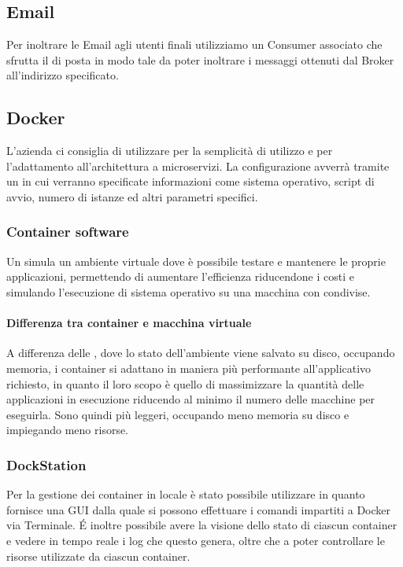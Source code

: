 		\subsection{Email}
		Per inoltrare le Email agli utenti finali utilizziamo un Consumer associato che sfrutta il  di posta
        in modo tale da poter inoltrare i messaggi ottenuti dal Broker all'indirizzo specificato.

		\subsection{Docker}
		L'azienda ci consiglia di utilizzare  per la semplicità di utilizzo e per l'adattamento all'architettura a microservizi.
		La configurazione avverrà tramite un  in cui verranno specificate informazioni come sistema operativo, script di avvio,
        numero di istanze ed altri parametri specifici.
        
        \subsubsection{Container software}\label{TecnologieContainer}
        
        Un  simula un ambiente virtuale dove è possibile testare e mantenere le proprie applicazioni, permettendo di aumentare l'efficienza riducendone i costi e simulando l'esecuzione di sistema operativo su una macchina con  condivise.
        
        \paragraph{Differenza tra container e macchina virtuale}
        A differenza delle , dove lo stato dell'ambiente viene salvato su disco, occupando memoria, i container si adattano in maniera più performante all'applicativo richiesto, in quanto il loro scopo è quello di massimizzare la quantità delle applicazioni in esecuzione riducendo al minimo il numero delle macchine per eseguirla.
        Sono quindi più leggeri, occupando meno memoria su disco e impiegando meno risorse.
        
        \subsubsection{DockStation}
        Per la gestione dei container in locale è stato possibile utilizzare  in quanto fornisce una GUI dalla quale si possono effettuare i comandi impartiti a Docker via Terminale.
        \'E inoltre possibile avere la visione dello stato di ciascun container e vedere in tempo reale i log che questo genera, oltre che a poter controllare le risorse utilizzate da ciascun container.
        

